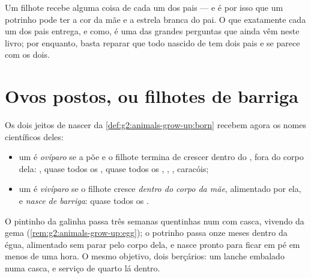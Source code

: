 \begin{remark}\label{rem:g4:animal-reproduction:mix}
Um filhote recebe alguma coisa de cada um dos pais --- e é por isso
que um potrinho pode ter a cor da mãe e a estrela branca do pai. O
que exatamente cada um dos pais entrega, e como, é uma das grandes
perguntas que ainda vêm neste livro; por enquanto, basta reparar que
todo  nascido de  tem dois pais e se parece
com os dois.
\end{remark}

\section{Ovos postos, ou filhotes de barriga}

\begin{definition}\label{def:g4:animal-reproduction:ovivivi}
Os dois jeitos de nascer da \cref{def:g2:animals-grow-up:born}
recebem agora os nomes científicos deles:
\begin{itemize}
  \item um  é \emph{ovíparo} se a  põe
        \emph{} e o filhote termina de crescer dentro do ,
        fora do corpo dela: , quase todos os , quase todos
        os , , , caracóis;
  \item um  é \emph{vivíparo} se o filhote
        cresce \emph{dentro do corpo da mãe}, alimentado por ela, e
        \emph{nasce de barriga}: quase todos os .
\end{itemize}
\end{definition}

\begin{example}\label{ex:g4:animal-reproduction:nurseries}
O pintinho da galinha passa três semanas quentinhas num  com
casca, vivendo da gema (\cref{rem:g2:animals-grow-up:egg}); o
potrinho passa onze meses dentro da égua, alimentado sem parar pelo
corpo dela, e nasce pronto para ficar em pé em menos de uma hora. O
mesmo objetivo, dois berçários: um lanche embalado numa casca, e
serviço de quarto lá dentro.
\end{example}

